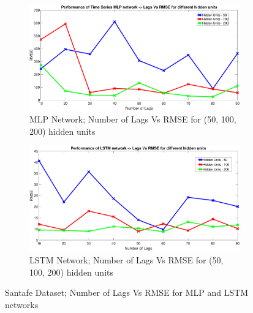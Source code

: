 \begin{figure}[!htpb]
	\centering
	\begin{subfigure}[b]{0.45\textwidth}
		\captionsetup{width=0.8\linewidth, format = hang}
		\includegraphics[height = 0.52\textwidth,width = 1\textwidth]{Exercise2/Report/mlp_lags}
		\caption{MLP Network; Number of Lags Vs RMSE for (50, 100, 200) hidden units }\label{fig:mlp_lags}
	\end{subfigure}%
	\begin{subfigure}[b]{0.45\textwidth}
		\captionsetup{width=0.8\linewidth, format = hang}
		\includegraphics[height = 0.52\textwidth,width = 1\textwidth]{Exercise2/Report/lstm_lags}
		\caption{LSTM Network; Number of Lags Vs RMSE for (50, 100, 200) hidden units }\label{fig:lstm_lags}
	\end{subfigure}%
	\caption{Santafe Dataset; Number of Lags Vs RMSE for MLP and LSTM networks}
	\label{fig:lags}
\end{figure}